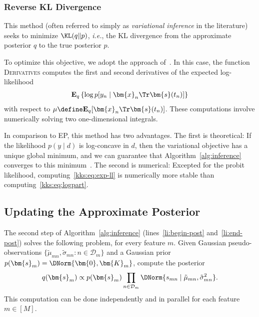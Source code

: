 \subsubsection{Reverse KL Divergence}

This method (often referred to simply as \emph{variational inference} in the literature) seeks to minimize $\KL(q \Vert p)$, \textit{i.e.}, the KL divergence from the approximate posterior $q$ to the true posterior $p$.

To optimize this objective, we adopt the approach of~\citet{khan2017conjugate}.
In this case, the function \textsc{Derivatives} computes the first and second derivatives of the expected log-likelihood
\begin{align}
	\label{kks:eq:exp-ll}
	\mathbf{E}_q \left\{ \log p[y_n \mid \bm{x}_n\Tr \bm{s}(t_n)] \right\}
\end{align}
with respect to $\mu \define \mathbf{E}_q[\bm{x}_n\Tr \bm{s}(t_n)]$.
These computations involve numerically solving two one-dimensional integrals.

In comparison to EP, this method has two advantages.
The first is theoretical:
If the likelihood $p(y \mid d)$ is log-concave in $d$, then the variational objective has a unique global minimum, and we can guarantee that Algorithm~\ref{alg:inference} converges to this minimum~\citep{khan2017conjugate}.
The second is numerical:
Excepted for the probit likelihood, computing~\eqref{kks:eq:exp-ll} is numerically more stable than computing~\eqref{kks:eq:logpart}.


\subsection{Updating the Approximate Posterior}
\label{kks:sec:inf-posterior}

The second step of Algorithm~\ref{alg:inference} (lines~\ref{li:begin-post} and~\ref{li:end-post}) solves the following problem, for every feature $m$.
Given Gaussian pseudo-observations $\{ \tilde{\mu}_{mn}, \tilde{\sigma}_{mn} : n \in \mathcal{D}_m \}$ and a Gaussian prior $p(\bm{s}_m) = \DNorm{\bm{0}, \bm{K}_m}$, compute the posterior
\begin{align*}
	q(\bm{s}_m) \propto p(\bm{s}_m) \prod_{n \in \mathcal{D}_m} \DNorm{s_{mn} \mid \tilde{\mu}_{mn}, \tilde{\sigma}^2_{mn}}.
\end{align*}
This computation can be done independently and in parallel for each feature $m \in [M]$.

